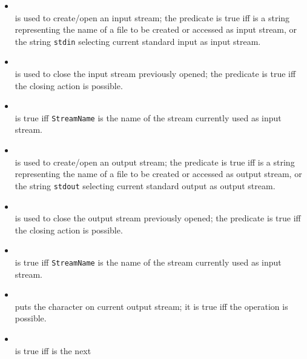 \begin{itemize}

\item {}\\
\noindent{} is used to create/open an input
stream; the predicate is true iff  is a string
representing the name of a file to be created or accessed as input
stream, or the string \texttt{stdin} selecting current standard
input as input stream.\\
%
\item {}\\
\noindent{} is used to close the input stream previously
opened; the predicate is true iff the closing action is possible.\\
%
\item {}\\
\noindent{} is true iff \texttt{StreamName}
is the name of the stream currently used as input stream.\\
%
\item {}\\
\noindent{} is used to create/open an output
stream; the predicate is true iff  is a string
representing the name of a file to be created or accessed as
output stream, or the string \texttt{stdout} selecting current
standard output as output stream.\\
%
\item {}\\
\noindent{} is used to close the output stream previously
opened; the predicate is true iff the closing action is possible.\\
%
\item {}\\
\noindent{} is true iff \texttt{StreamName}
is the name of the stream currently used as input stream.\\
%
\item {}\\
\noindent{} puts the character  on
current output stream; it is true iff the operation is possible.\\
%
\item {}\\
\noindent{} is true iff  is the next

\end{itemize}
